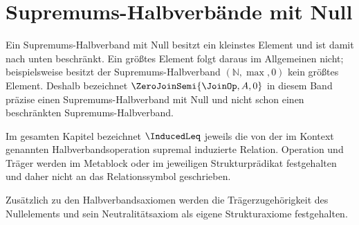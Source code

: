 \documentclass[main.tex]{subfiles}
\begin{document}
\section{Supremums-Halbverbände mit Null}

Ein Supremums-Halbverband mit Null besitzt ein kleinstes Element und ist
damit nach unten beschränkt. Ein größtes Element folgt daraus im Allgemeinen
nicht; beispielsweise besitzt der Supremums-Halbverband
\((\mathbb{N},\max,0)\) kein größtes Element. Deshalb bezeichnet
\(\ZeroJoinSemi{\JoinOp,A,0}\) in diesem Band präzise einen
Supremums-Halbverband mit Null und nicht schon einen beschränkten
Supremums-Halbverband.

Im gesamten Kapitel bezeichnet \(\InducedLeq\) jeweils die von der im
Kontext genannten Halbverbandsoperation supremal induzierte Relation.
Operation und Träger werden im Metablock oder im jeweiligen
Strukturprädikat festgehalten und daher nicht an das Relationssymbol
geschrieben.

Zusätzlich zu den Halbverbandsaxiomen werden die Trägerzugehörigkeit des
Nullelements und sein Neutralitätsaxiom als eigene Strukturaxiome festgehalten.

\par\smallskip

\par\smallskip


\end{document}
